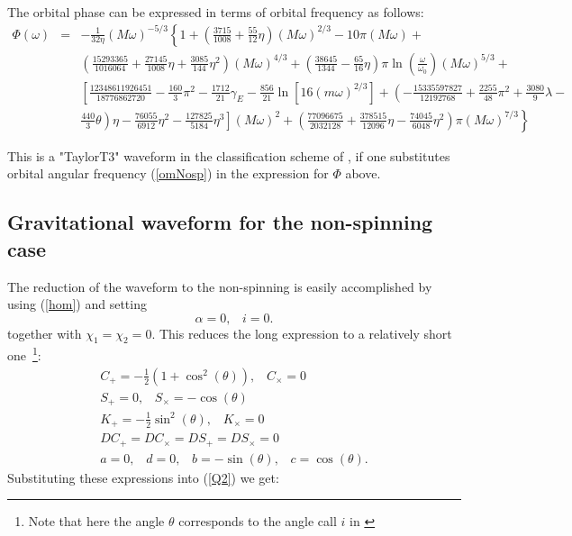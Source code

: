 \documentclass[11pt]{report}
\def\be{\begin{equation}}
\def\ee{\end{equation}}
\def\bea{\begin{eqnarray}}
\def\ena{\end{eqnarray}}
\begin{document}

The orbital phase can be expressed in terms of orbital frequency as follows:
\bea
\Phi(\omega)  &=& -\frac1{32\eta}(M\omega)^{-5/3}\left\{ 1 + \left( \frac{3715}{1008} + \frac{55}{12}\eta\right)
(M\omega)^{2/3} - 10\pi(M\omega) + \right. \nonumber \\
& & \left. \left( \frac{15293365}{1016064} + \frac{27145}{1008}\eta + \frac{3085}{144}\eta^2\right)
(M\omega)^{4/3} + \left( \frac{38645}{1344} - \frac{65}{16}\eta \right)\pi\ln\left( \frac{\omega}{\omega_0}\right) (M\omega)^{5/3}+ \right. \nonumber \\
& &  \left. \left[ \frac{12348611926451}{18776862720} -\frac{160}{3}\pi^2 - \frac{1712}{21}\gamma_E
- \frac{856}{21}\ln\left[ 16(m\omega)^{2/3}\right] + \left( -\frac{15335597827}{12192768} +
\frac{2255}{48}\pi^2 + \frac{3080}{9}\lambda - \right.\right.\right. \nonumber \\
& & \left.\left.\left.  \frac{440}{3}\theta\right)\eta - \frac{76055}{6912}\eta^2 - 
\frac{127825}{5184}\eta^3\right](M\omega)^{2} + \left( \frac{77096675}{2032128} + 
\frac{378515}{12096}\eta - \frac{74045}{6048}\eta^2\right)\pi(M\omega)^{7/3} 
\right\}
\ena

This is a "TaylorT3" waveform in the classification scheme of \cite{DIS}, if one substitutes orbital angular frequency (\ref{omNosp}) in the 
expression for $\Phi$ above.

\subsection{Gravitational waveform for the non-spinning case}

The reduction of the waveform to the non-spinning  is easily accomplished by using (\ref{hom})
and setting 
\be
\alpha =0,\;\;\; i = 0.
\ee
together with $\chi_1=\chi_2=0$.
This reduces the long expression to a relatively short one~\footnote{Note that here the angle $\theta$ corresponds
to the angle call $i$ in \cite{FC}}:
\bea
C_{+} = -\frac1{2}(1+ \cos^2(\theta)), \;\;\; C_{\times} = 0\\
S_{+} = 0,\;\;\; S_{\times} = -\cos(\theta)\\
K_{+} = -\frac1{2}\sin^2(\theta),\;\;\; K_{\times} = 0\\
DC_{+}=DC_{\times}=DS_{+}=DS_{\times} = 0\\
a=0,\;\;\; d=0,\;\;\; b=-\sin(\theta),\;\;\; c=\cos(\theta). 
\ena
Substituting these expressions into (\ref{Q2}) we get:
\end{document}
